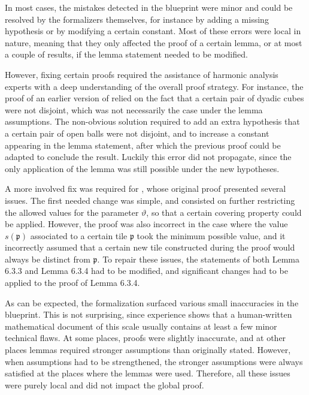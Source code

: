 \documentclass[12pt]{amsart}
\theoremstyle{definition}
\theoremstyle{plain}
\begin{document}
In most cases, the mistakes detected in the blueprint were minor and could be resolved by the formalizers themselves, for instance by adding a missing hypothesis or by modifying a certain constant. Most of these errors were local in nature, meaning that they only affected the proof of a certain lemma, or at most a couple of results, if the lemma statement needed to be modified.

However, fixing certain proofs required the assistance of harmonic analysis experts with a deep understanding of the overall proof strategy. For instance, the proof of an earlier version of \cite[Lemma 6.2.3]{CarlesonBlueprint} relied on the fact that a certain pair of dyadic cubes were not disjoint, which was not necessarily the case under the lemma assumptions. The non-obvious solution required to add an extra hypothesis that a certain pair of open balls were not disjoint, and to increase a constant appearing in the lemma statement, after which the previous proof could be adapted to conclude the result. Luckily this error did not propagate, since the only application of the lemma was still possible under the new hypotheses.

A more involved fix was required for \cite[Lemma 6.3.4]{CarlesonBlueprint}, whose original proof presented several issues. The first needed change was simple, and consisted on further restricting the allowed values for the parameter $\vartheta$, so that a certain covering property could be applied. However, the proof was also incorrect in the case where the value $s(\mathfrak{p})$ associated to a certain tile $\mathfrak{p}$ took the minimum possible value, and it incorrectly assumed that a certain new tile constructed during the proof would always be distinct from $\mathfrak{p}$. To repair these issues, the statements of both Lemma 6.3.3 and Lemma 6.3.4 had to be modified, and significant changes had to be applied to the proof of Lemma 6.3.4.


As can be expected, the formalization surfaced various small inaccuracies in the blueprint. This is not surprising, since experience shows that a human-written mathematical document of this scale usually contains at least a few minor technical flaws.
At some places, proofs were slightly inaccurate, and at other places lemmas required stronger assumptions than originally stated. However, when assumptions had to be strengthened, the
stronger assumptions were always satisfied at the places where the lemmas
were used. Therefore, all these issues were purely local and did not impact the global proof.
\end{document}
